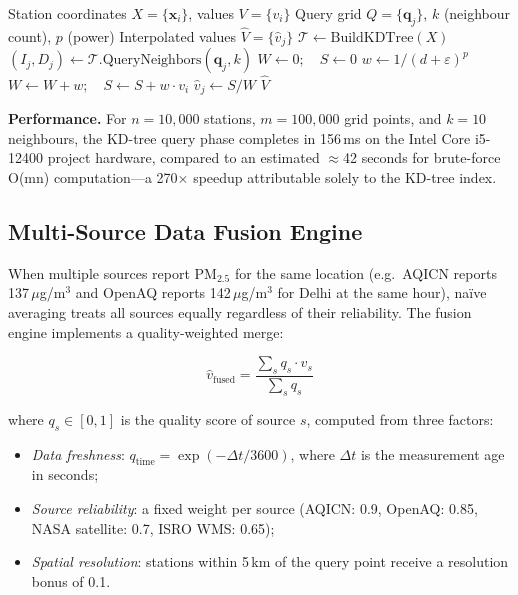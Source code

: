 \documentclass[12pt,a4paper]{article}
\begin{document}
\begin{algorithm}[H]
\caption{KD-Tree Optimised IDW Interpolation}
\label{alg:idw}
\begin{algorithmic}[1]
\Require Station coordinates $X = \{\mathbf{x}_i\}$, values $V = \{v_i\}$
\Require Query grid $Q = \{\mathbf{q}_j\}$, $k$ (neighbour count), $p$ (power)
\Ensure  Interpolated values $\hat{V} = \{\hat{v}_j\}$
\State $\mathcal{T} \leftarrow \text{BuildKDTree}(X)$ 
  \State $(I_j, D_j) \leftarrow \mathcal{T}.\text{QueryNeighbors}(\mathbf{q}_j, k)$ 
  \State $W \leftarrow 0;\quad S \leftarrow 0$
    \State $w \leftarrow 1/(d + \varepsilon)^p$
    \State $W \leftarrow W + w;\quad S \leftarrow S + w \cdot v_i$
  \EndFor
  \State $\hat{v}_j \leftarrow S / W$
\EndFor
\State \Return $\hat{V}$
\end{algorithmic}
\end{algorithm}

\noindent\textbf{Performance.} For $n = 10{,}000$ stations, $m = 100{,}000$
grid points, and $k = 10$ neighbours, the KD-tree query phase completes in
156\,ms on the Intel Core i5-12400 project hardware, compared to an estimated
$\approx$42 seconds for brute-force O(mn) computation---a 270$\times$
speedup attributable solely to the KD-tree index.

\subsection{Multi-Source Data Fusion Engine}
\label{sec:impl:fusion}

When multiple sources report $\text{PM}_{2.5}$ for the same location (e.g.\
AQICN reports 137\,$\mu$g/m$^3$ and OpenAQ reports 142\,$\mu$g/m$^3$ for
Delhi at the same hour), na\"ive averaging treats all sources equally regardless
of their reliability. The fusion engine implements a quality-weighted merge:

\begin{equation}
\hat{v}_{\text{fused}} = \frac{\sum_s q_s \cdot v_s}{\sum_s q_s}
\label{eq:qualityfusion}
\end{equation}

\noindent where $q_s \in [0,1]$ is the quality score of source $s$, computed
from three factors:
\begin{itemize}[leftmargin=*]
\item \emph{Data freshness}: $q_{\text{time}} = \exp(-\Delta t / 3600)$, where
      $\Delta t$ is the measurement age in seconds;
\item \emph{Source reliability}: a fixed weight per source
      (AQICN: 0.9, OpenAQ: 0.85, NASA satellite: 0.7, ISRO WMS: 0.65);
\item \emph{Spatial resolution}: stations within 5\,km of the query point
      receive a resolution bonus of 0.1.
\end{itemize}
\end{document}
